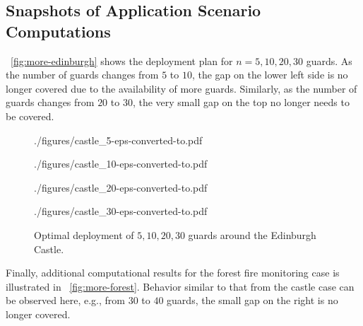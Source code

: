 \subsection{Snapshots of Application Scenario Computations}
~\ref{fig:more-edinburgh} shows the deployment plan for $n = 5, 10, 20, 
30$ guards. As the number of guards changes from $5$ to $10$, the gap on the
lower left side is no longer covered due to the availability of more guards.
Similarly, as the number of guards changes from $20$ to $30$, the very small 
gap on the top no longer needs to be covered.  

\begin{figure}[ht!]
	\begin{center}
		\begin{overpic}[width={\ifoc 4in \else 2.05in \fi},tics=5]{./figures/castle_5-eps-converted-to.pdf}
		\end{overpic}
    \end{center}
	\begin{center}
		\begin{overpic}[width={\ifoc 4in \else 2.05in \fi},tics=5]{./figures/castle_10-eps-converted-to.pdf}
		\end{overpic}
    \end{center}
	\begin{center}
		\begin{overpic}[width={\ifoc 4in \else 2.05in \fi},tics=5]{./figures/castle_20-eps-converted-to.pdf}
		\end{overpic}
    \end{center}
	\begin{center}
		\begin{overpic}[width={\ifoc 4in \else 2.05in \fi},tics=5]{./figures/castle_30-eps-converted-to.pdf}
		\end{overpic}
	\end{center}
	\vspace*{-2mm}
	\caption{\label{fig:opg-more-edinburgh} Optimal deployment of $5, 10, 20, 30$ 
	guards around the Edinburgh Castle.}
\end{figure}

Finally, additional computational results for the forest fire monitoring
case is illustrated in ~\ref{fig:more-forest}. Behavior similar to that 
from the castle case can be observed here, e.g., from $30$ to $40$ 
guards, the small gap on the right is no longer covered. 

